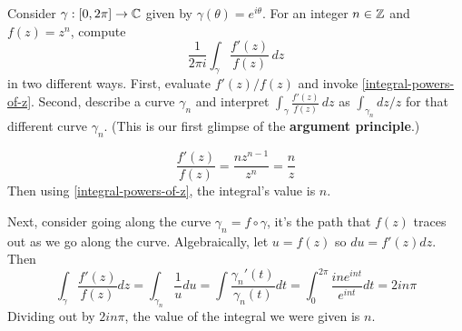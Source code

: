 \documentclass{homework}
\begin{document}
                                                          \begin{problem}\label{argument-principle-numerical}Consider $\gamma : [0,2\pi] \to \mathbb{C}$ given by $\gamma(\theta) = e^{i\theta}$.  For an integer $n \in \mathbb{Z}$ and $f(z) = z^n$, compute
                                                            \[
                                                                \frac{1}{2\pi i} \displaystyle\int_\gamma \frac{f'(z)}{f(z)} \, dz
                                                                  \]
                                                                    in two different ways.  First, evaluate $f'(z)/f(z)$ and invoke
                                                                      \ref{integral-powers-of-z}.  Second, describe a curve $\gamma_n$ and
                                                                        interpret $\int_\gamma \frac{f'(z)}{f(z)} \, dz$ as
                                                                          $\int_{\gamma_n} dz/z$ for that different curve $\gamma_n$.  (This
                                                                            is our first glimpse of the \textbf{argument principle}.)
                                                                            \end{problem}
                                                                            \begin{solution}
                                                                            \[\frac{f'(z)}{f(z)} = \frac{nz^{n-1}}{z^n} = \frac{n}{z}\]
                                                                            Then using \ref{integral-powers-of-z}, the integral's value is $n$.

                                                                            Next, consider going along the curve $\gamma_n = f\circ \gamma$, it's the path that $f(z)$ traces out as we go along the curve. Algebraically, let $u = f(z)$ so $du = f'(z) dz.$
                                                                            Then
                                                                            \[
                                                                            \int_{\gamma} \frac{f'(z)}{f(z)}dz =  \int_{\gamma_n} \frac{1}{u} du = \int \frac{\gamma_n'(t)}{\gamma_n(t)}dt = \int_0^{2\pi} \frac{ine^{int}}{e^{int}}dt = 2in\pi
                                                                            \]
                                                                            Dividing out by $2in\pi$, the value of the integral we were given is $n$. 
                                                                            \end{solution}
\end{document}
